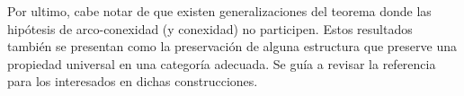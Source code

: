 Por ultimo, cabe notar de que existen generalizaciones del teorema
\vank donde las hipótesis de arco-conexidad (y conexidad) no participen.
Estos resultados también se presentan como la preservación de alguna
estructura que preserve una propiedad universal en una categoría
adecuada. Se guía a revisar la referencia \cite{brown} para los
interesados en dichas construcciones.
